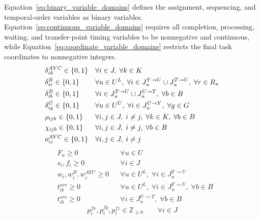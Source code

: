 Equation~\ref{eq:binary_variable_domains} defines the assignment, sequencing, and temporal-order variables as binary variables. Equation~\ref{eq:continuous_variable_domains} requires all completion, processing, waiting, and transfer-point timing variables to be nonnegative and continuous, while Equation~\ref{eq:coordinate_variable_domains} restricts the final task coordinates to nonnegative integers.
\begin{equation}
\label{eq:binary_variable_domains}
\begin{aligned}
&\delta_{ik}^{AYC}\in\{0,1\}
&&\forall i\in J,\;\forall k\in K\\
&\delta_{ir}^{R}\in\{0,1\}
&&\forall u\in U^{L},\;\forall i\in J_u^{Y\rightarrow U}\cup J_u^{T\rightarrow U},\;\forall r\in R_u\\
&\delta_{ib}^{B}\in\{0,1\}
&&\forall i\in J_{u}^{T\rightarrow U}
\cup
J_{u}^{U\rightarrow T},\;\forall b\in B\\
&\delta_{ig}^{G}\in\{0,1\}
&&\forall u\in U^{U},\;\forall i\in J_u^{U\rightarrow Y},\;\forall g\in G\\
&\rho_{ijk}\in\{0,1\}
&&\forall i,j\in J,\;i\neq j,\;\forall k\in K,\;\forall b\in B\\
&\chi_{ijb}\in\{0,1\}
&&\forall i,j\in J,\;i\neq j,\;\forall b\in B\\
&o_{ij}^{AYC}\in\{0,1\}
&&\forall i,j\in J,\;i\neq j
\end{aligned}
\raisetag{3\baselineskip}
\end{equation}
\begin{equation}
\label{eq:continuous_variable_domains}
\begin{aligned}
&F_u\geq0
&&\forall u\in U\\
&s_i,f_i\geq0
&&\forall i\in J\\
&w_i,w_i^{B},w_i^{AYC}\geq0
&&\forall u\in U^{L},\;\forall i\in J_u^{T\rightarrow U}\\
&t_{ib}^{arr}\geq0
&&\forall u\in U^{L},\;\forall i\in J_u^{T\rightarrow U},\;\forall b\in B\\
&t_{ib}^{srv}\geq0
&&\forall i\in J_{u}^{U\rightarrow T},\;\forall b\in B
\end{aligned}
\end{equation}
\begin{equation}
\label{eq:coordinate_variable_domains}
p_i^{fx},p_i^{fy},p_i^{fz}\in\mathbb{Z}_{\geq0}
\qquad
\forall i\in J
\end{equation}

